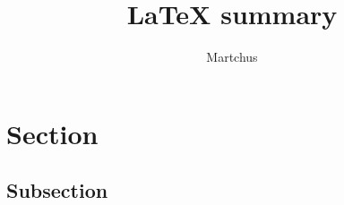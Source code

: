 \documentclass[a4paper,12pt,DIV15]{scrartcl}
\title{\LaTeX{} summary}
\author{Martchus}
\begin{document}
\maketitle
\clearpage
\tableofcontents
\clearpage

\section{Section}
    \subsection{Subsection}

\end{document}
